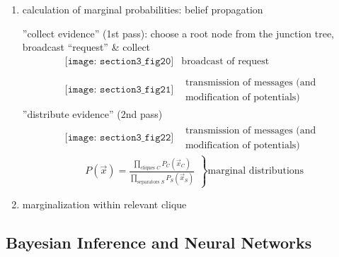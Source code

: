 \begin{enumerate}[-a-]
  \item calculation of marginal probabilities: belief propagation
    \begin{itemize}
      \itr ''collect evidence'' (1st pass): choose a root node from the junction tree, broadcast ``request'' \& collect
      \[ \begin{array}{ll}
        \texttt{[image: section3\_fig20]} 
        & \text{broadcast of request} \\\\
        \texttt{[image: section3\_fig21]} 
      & \substack{ \text{transmission of 
          messages (and} \\
        \text{modification of 
          potentials)}}
    \end{array} \]
    \itr ''distribute evidence'' (2nd pass) 
    \[ \begin{array}{ll}
      \texttt{[image: section3\_fig22]} 
      & \substack{ \text{transmission of 
          messages (and} \\
        \text{modification of 
          potentials)}}
    \end{array} \]
    \itR \begin{equation}
      \left. \begin{array}{l}
          P(\vec{x}) = \frac{\prod\limits_{\text{cliques }
              C} P_C(\vec{x}_C)}{\prod\limits_{
              \text{separators }S} P_S(
            \vec{x}_S)}
        \end{array} \right \} \text{marginal
        distributions}
    \end{equation}
  \end{itemize}
\item marginalization within relevant clique

\end{enumerate}


\newpage 						%
\subsection{Bayesian Inference and Neural Networks}

